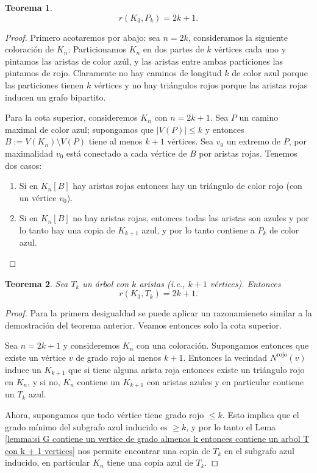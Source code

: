 \documentclass[12pt]{report}
\theoremstyle{plain}
\newtheorem{theorem}{Teorema}[section]
\theoremstyle{definition}
\newcommand{\abs}[1]{\left \vert #1 \right \vert}
\begin{document}
\begin{theorem}
\[
    r(K_3, P_k) = 2k +1.
\]
\end{theorem}
\begin{proof}
Primero acotaremos por abajo: sea $n = 2k$, consideramos la siguiente coloración de $K_n$:
Particionamos $K_n$ en dos partes de $k$ vértices cada uno y pintamos las aristas de color azúl, y las aristas entre ambas particiones las pintamos de rojo. Claramente no hay caminos de longitud $k$ de color azul porque las particiones tienen $k$ vértices y no hay triángulos rojos porque las aristas rojas inducen un grafo bipartito.

Para la cota superior, consideremos $K_n$ con $n = 2k + 1$. Sea $P$ un camino maximal de color azul; supongamos que $\abs{V (P)} \leq k$ y entonces $B := V(K_n) \setminus V(P)$ tiene al menos $k+1$ vértices. Sea $v_0$ un extremo de $P$, por maximalidad $v_0$ está conectado a cada vértice de $B$ por aristas rojas. Tenemos dos casos:
\begin{enumerate}
\item[\textbf{Caso 1:}] Si en $K_n [B]$ hay aristas rojas entonces hay un triángulo de color rojo (con un vértice $v_0$).
\item[\textbf{Caso 2:}] Si en $K_n [B]$ no hay aristas rojas, entonces todas las aristas son azules y por lo tanto hay una copia de $K_{k+1}$ azul, y por lo tanto contiene a $P_k$ de color azul.
\end{enumerate}
\end{proof}

\begin{theorem}
Sea $T_k$ un árbol con $k$ aristas (i.e., $k+1$ vértices). Entonces
\[
    r(K_3, T_k) = 2k +1.
\]
\end{theorem}
\begin{proof}
Para la primera desigualdad se puede aplicar un razonamieneto similar a la demostración del teorema anterior. Veamos entonces solo la cota superior.

Sea $n = 2k + 1$ y consideremos $K_n$ con una coloración. Supongamos entonces que existe un vértice $v$ de grado rojo al menos $k+1$. Entonces la vecindad $N^{\text{rojo}} (v)$ induce un $K_{k+1}$ que si tiene alguna arista roja entonces existe un triángulo rojo en $K_n$, y si no, $K_n$ contiene un $K_{k+1}$ con aristas azules y en particular contiene un $T_k$ azul.


Ahora, supongamos que todo vértice tiene grado rojo $\leq k$. Esto implica que el grado mínimo del subgrafo azul inducido es $\geq k$, y por lo tanto el Lema \ref{lemma:si G contiene un vertice de grado almenos k entonces contiene un arbol T con k + 1 vertices} nos permite encontrar una copia de $T_k$ en el subgrafo azul inducido, en particular $K_n$ tiene una copia azul de $T_k$.
\end{proof}
\end{document}
